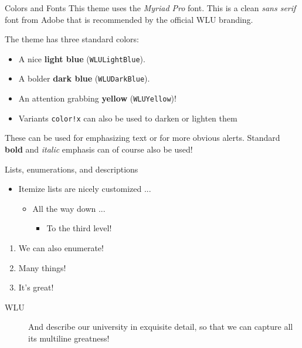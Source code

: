 \documentclass[final]{beamer}
\begin{document}
\begin{frame}[fragile]
\begin{columns}[t]
\begin{column}{0.3\paperwidth}
\begin{block}{Colors and Fonts}
    This theme uses the \emph{Myriad Pro} font. This is a clean \emph{sans serif}
    font from Adobe that is recommended by the official WLU branding.

    \bigskip
    The theme has three standard colors:
    \begin{itemize}
        \item A nice \textcolor{WLULightBlue}{\textbf{light blue}} (\texttt{WLULightBlue}).
        \item A bolder \textcolor{WLUDarkBlue}{\textbf{dark blue}} (\texttt{WLUDarkBlue}).
        \item An attention grabbing \textcolor{WLUYellow}{\textbf{yellow}}
        (\texttt{WLUYellow})!
        \item Variants \texttt{color!x} can also be used to darken or lighten them
    \end{itemize}

    \bigskip
    These can be used for emphasizing \textcolor{WLULightBlue}{text} or for
    more obvious \alert{alerts}. Standard \textbf{bold} and \textit{italic} emphasis
    can of course also be used!
\end{block}

\begin{alertblock}{Lists, enumerations, and descriptions}

\begin{itemize}
    \item Itemize lists are nicely customized ...
    \begin{itemize}
        \item All the way down ...
        \begin{itemize}
            \item To the third level!
        \end{itemize}
    \end{itemize}
\end{itemize}


\begin{enumerate}
    \item We can also enumerate!
    \item Many things!
    \item It's great!
\end{enumerate}


\begin{description}
    \item[WLU] And describe our university in exquisite detail, so that we
        can capture all its multiline greatness!
\end{description}
\end{alertblock}
\end{column}


\end{columns}
\end{frame}
\end{document}
